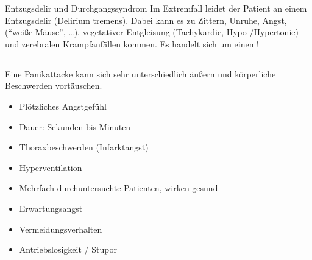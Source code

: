 \label{topic:alkoholentzugsdelir}
\label{topic:durchgangssyndrom}

\Text
{Entzugsdelir und Durchgangssyndrom}%
{%
Im Extremfall
leidet der Patient an einem Entzugsdelir (Delirium tremens). Dabei kann  es zu
Zittern, Unruhe, Angst,  (\enquote{weiße
Mäuse}, \ldots), vegetativer Entgleisung (Tachykardie,
Hypo-/Hypertonie) und zerebralen Krampfanfällen kommen. Es
handelt sich um einen !
}%



\subsection{}

\Text
{{\TxBeschreibung}}%
{%
Eine Panikattacke kann sich sehr unterschiedlich äußern und
körperliche Beschwerden vortäuschen.

\begin{itemize}
    \item Plötzliches Angstgefühl
    \item Dauer: Sekunden bis Minuten
    \item Thoraxbeschwerden (Infarktangst)
    \item Hyperventilation 
    \item Mehrfach durchuntersuchte  Patienten, wirken gesund
    \item Erwartungsangst
    \item Vermeidungsverhalten
    \item Antriebslosigkeit / Stupor
\end{itemize}
}%





\begin{Literary}







\end{Literary}


\ChapterEnd